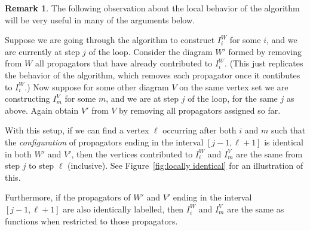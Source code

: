 \documentclass[11pt]{article}
\theoremstyle{remark}
\theoremstyle{definition}
\newtheorem{rmk}[thm]{Remark}
\begin{document}
\begin{rmk}\label{rmk algorithm locally same}
The following observation about the local behavior of the algorithm will be very useful in many of the arguments below.

Suppose we are going through the algorithm to construct $I_i^W$ for some $i$, and we are currently at step $j$ of the loop. Consider the diagram $W'$ formed by removing from $W$ all propagators that have already contributed to $I_i^W$. (This just replicates the behavior of the algorithm, which removes each propagator once it contibutes to $I_i^W$.)  Now suppose for some other diagram $V$ on the same vertex set we are constructing $I_m^V$ for some $m$, and we are at step $j$ of the loop, for the same $j$ as above.  Again obtain $V'$ from $V$ by removing all propagators assigned so far.

With this setup, if we can find a vertex $\ell$ occurring after both $i$ and $m$ such that the \emph{configuration} of propagators ending in the interval $[j-1, \ell+1]$ is identical in both $W'$ and $V'$, then the vertices contributed to $I_i^W$ and $I_m^V$ are the same from step $j$ to step $\ell$ (inclusive). See Figure~\ref{fig:locally identical} for an illustration of this.

Furthermore, if the propagators of $W'$ and $V'$ ending in the interval $[j-1, \ell+1]$ are also identically labelled, then $I_i^W$ and $I_m^V$ are the same as functions when restricted to those propagators.


\end{rmk}
\end{document}
